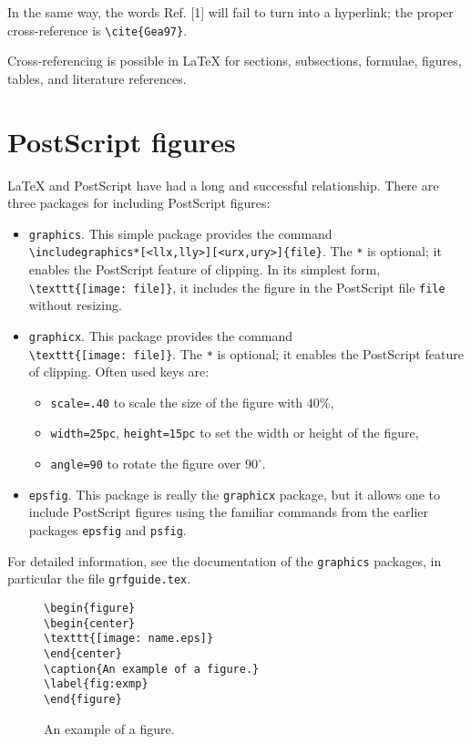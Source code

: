 \documentclass{elsart}
\begin{document}
In the same way, the words Ref. [1] will fail to
turn into a hyperlink; the proper cross-reference is 
\verb|\cite{Gea97}|.

Cross-referencing is possible in \LaTeX{} for sections, subsections,
formulae, figures, tables, and literature references.

\section{PostScript figures}
\label{psfigs}

\LaTeX{} and PostScript have had a long and successful relationship.
There are three packages for including PostScript figures:
\begin{itemize}
\item \texttt{graphics}.
This simple package provides the command\\
\verb|\includegraphics*[<llx,lly>][<urx,ury>]{file}|.
The \texttt{*} is optional; it enables the PostScript feature of clipping.
In its simplest form,\\
\verb|\texttt{[image: file]}|,
it includes the figure in the PostScript file \texttt{file}
without resizing.
\item \texttt{graphicx}.
This package provides the command\\
\verb|\texttt{[image: file]}|.
The \texttt{*} is optional; it enables the PostScript feature of clipping.
Often used keys are:
\def\labelitemii{--}
\begin{itemize}
\item \texttt{scale=.40} to scale the size of the figure with 40\%,
\item \texttt{width=25pc}, \texttt{height=15pc} to set the width or
height of the figure,
\item \texttt{angle=90} to rotate the figure over $90^\circ$.
\end{itemize}
\item \texttt{epsfig}.
This package is really the \texttt{graphicx} package,
but it allows one to include PostScript figures using 
the familiar commands from 
the earlier packages \texttt{epsfig} and \texttt{psfig}.
\end{itemize}
For detailed information, see the documentation of the \texttt{graphics}
packages, in particular the file \texttt{grfguide.tex}.
\begin{figure}
\leftmargin=2pc
\begin{verbatim}
\begin{figure}
\begin{center}
\texttt{[image: name.eps]}
\end{center}
\caption{An example of a figure.}
\label{fig:exmp}
\end{figure}
\end{verbatim} 
\caption{An example of a figure.}
\label{fig:exmp}
\end{figure}
\end{document}
